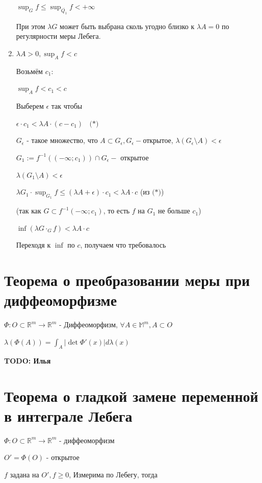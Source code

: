 \documentclass[paper=a4, fontsize=17pt]{article}
\begin{document}
\begin{enumerate}
	$\sup_G f \leqslant \sup_{\overline{Q_1}} f < + \infty$
	
	При этом $\lambda G$ может быть выбрана сколь угодно близко к $\lambda A = 0$ по регулярности меры Лебега.
	
	\item $\lambda A > 0, \sup_A f < c$
	
	Возьмём $c_1$:
	
	$\sup_A f < c_1 < c$
	
	Выберем $\epsilon$ так чтобы
	
	$\epsilon \cdot c_1 < \lambda A \cdot (c - c_1) ~~~~ \textbf{(*)}$
	
	$G_{\epsilon}$ - такое множество, что $A \subset G_{\epsilon}, G_{\epsilon}-$открытое, $\lambda(G_{\epsilon} \setminus A) < \epsilon$
	
	$G_1 := f^{-1}((- \infty; c_1)) \cap G_{\epsilon} - $ открытое
	
	$\lambda(G_1 \setminus A) < \epsilon$
	
	$\lambda G_1 \cdot \sup_{G_1} f \leqslant (\lambda A + \epsilon) \cdot c_1 < \lambda A \cdot c$ (из $\textbf{(*)}$)
	
	(так как $G \subset f^{-1}(- \infty; c_1)$, то есть $f$ на $G_1$ не больше $c_1$) 
	
	$\inf(\lambda G \cdot_G f) < \lambda A \cdot c$
	
	Переходя к $\inf$ по $c$, получаем что требовалось
\end{enumerate}

\section{Теорема о преобразовании меры при диффеоморфизме}
$\Phi: O \subset \mathds{R}^m \rightarrow \mathds{R}^m$ - Диффеоморфизм, $\forall A \in \mathds{M}^m, A \subset O$

$\lambda(\Phi(A)) = \int_A |\det \Phi' (x)| d \lambda(x)$

\textbf{TODO: Илья}

\section{Теорема о гладкой замене переменной в интеграле Лебега}
$\Phi: O \subset \mathds{R}^m \rightarrow \mathds{R}^m$ - диффеоморфизм

$O' = \Phi(O)$ - открытое

$f$ задана на $O', f \geqslant 0$, Измерима по Лебегу, тогда
\end{document}
